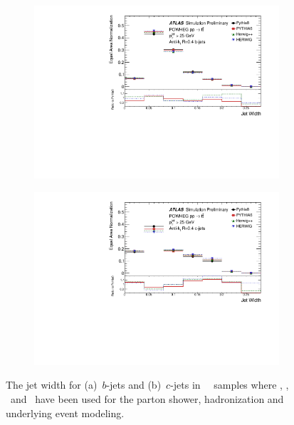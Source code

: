 \begin{figure}
\centering
\begin{subfigure}[]{0.45\textwidth}
\includegraphics[width=\textwidth]{evtgen/figures/Frag/Top/SingleB/h_JetWidth.pdf}
\end{subfigure}
\begin{subfigure}[]{0.45\textwidth}
\includegraphics[width=\textwidth]{evtgen/figures/Frag/Top/SingleC/h_JetWidth.pdf}
\end{subfigure}
\caption{The jet width for 
(a)~$b$-jets and (b)~$c$-jets in \PowHeg\
\ttbar\ samples where  \PythiaE, \Pythia, \Herwigpp\ and \Herwig\ have been used 
for the parton shower, hadronization and underlying event modeling. }
\label{fig:twidth}
\end{figure}

